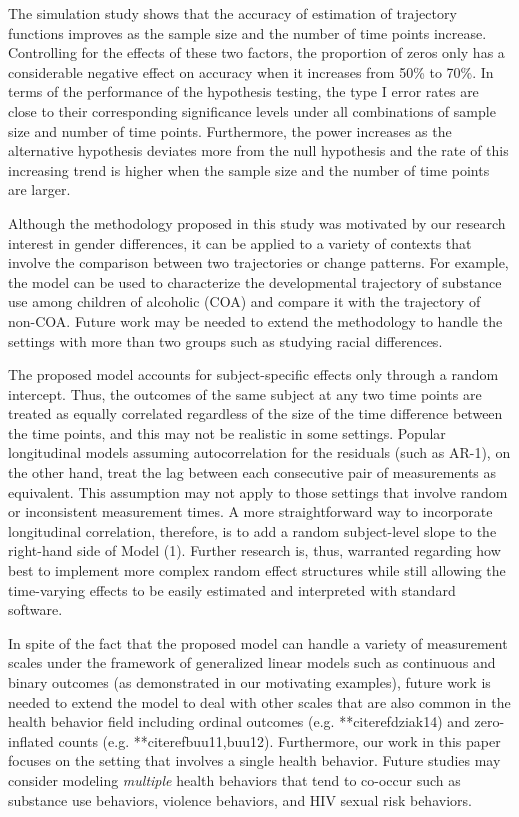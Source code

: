 The simulation study shows that the accuracy of estimation of
trajectory functions improves as the sample size and the number of
time points increase. Controlling for the effects of these two
factors, the proportion of zeros only has a considerable negative
effect on accuracy when it increases from 50\% to 70\%. In terms
of the performance of the hypothesis testing, the type I error
rates are close to their corresponding significance levels under
all combinations of sample size and number of time points.
Furthermore, the power increases as the alternative hypothesis
deviates more from the null hypothesis and the rate of this
increasing trend is higher when the sample size and the number of
time points are larger.

Although the methodology proposed in this study was motivated by
our research interest in gender differences, it can be applied to
a variety of contexts that involve the comparison between two
trajectories or change patterns. For example, the model can be
used to characterize the developmental trajectory of substance use
among children of alcoholic (COA) and compare it with the
trajectory of non-COA. Future work may be needed to extend the
methodology to handle the settings with more than two groups such
as studying racial differences.

The proposed model accounts for subject-specific effects only
through a random intercept. Thus, the outcomes of the same subject
at any two time points are treated as equally correlated
regardless of the size of the time difference between the time
points, and this may not be realistic in some settings. Popular
longitudinal models assuming autocorrelation for the residuals
(such as AR-1), on the other hand, treat the lag between each
consecutive pair of measurements as equivalent. This assumption
may not apply to those settings that involve random or
inconsistent measurement times. A more straightforward way to
incorporate longitudinal correlation, therefore, is to add a
random subject-level slope to the right-hand side of Model (1).
Further research is, thus, warranted regarding how best to
implement more complex random effect structures while still
allowing the time-varying effects to be easily estimated and
interpreted with standard software.


In spite of the fact that the proposed model can handle a variety
of measurement scales under the framework of generalized linear
models such as continuous and binary outcomes (as demonstrated in
our motivating examples), future work is needed to extend the
model to deal with other scales that are also common in the health
behavior field including ordinal outcomes (e.g. **citeref{dziak14})
and zero-inflated counts (e.g. **citeref{buu11,buu12}). Furthermore,
our work in this paper focuses on the setting that involves a
single health behavior. Future studies may consider modeling
\emph{multiple} health behaviors that tend to co-occur such as
substance use behaviors, violence behaviors, and HIV sexual risk
behaviors.
